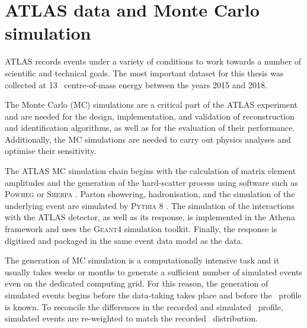 \section{ATLAS data and Monte Carlo simulation}

ATLAS records events under a variety of conditions to work towards a number of
scientific and technical goals. The most important dataset for this thesis
was collected at 13 \TeV~centre-of-mass energy between the years 2015
and 2018.

The Monte Carlo (MC) simulations are a critical part of the ATLAS experiment
and are needed for the design, implementation, and validation of
reconstruction and identification algorithms, as well as for the evaluation
of their performance. Additionally, the MC simulations are needed to
carry out physics analyses and optimise their sensitivity.

The ATLAS MC simulation chain begins with the calculation of matrix element 
amplitudes and the generation of the hard-scatter process using
software such as \textsc{Powheg} \cite{powheg, Frixione_2007, Alioli_2010}
or \textsc{Sherpa} \cite{sherpa1, sherpa2}. Parton showering, hadronisation,
and the simulation of the underlying event are simulated by
\textsc{Pythia} 8 \cite{Sj_strand_2008}. The simulation of the
interactions with the ATLAS detector, as well as its response, is
implemented in the Athena framework \cite{Aad:2010ah, Duckeck:2005rb} and uses the
\textsc{Geant4} \cite{Agostinelli:2002hh, 1610988, ALLISON2016186}
simulation toolkit. Finally, the response is digitised
and packaged in the same event data model \cite{Buckley_2015} as the
data.

The generation of MC simulation is a computationally intensive task
and it usually takes weeks or months to generate a sufficient number
of simulated events even on the dedicated computing grid. For this
reason, the generation of simulated events begins before the data-taking
takes place and before the \pileup~profile is known. To reconcile the
differences in the recorded and simulated \pileup~profile, simulated
events are re-weighted to match the recorded \pileup~distribution.







